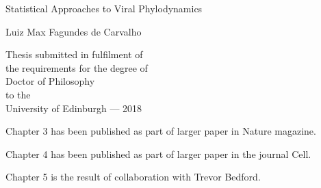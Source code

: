 \thispagestyle{empty}
\begin{minipage}{\textwidth}
\end{minipage}
\begin{center}
\vspace{2cm}
{ \Huge Statistical Approaches to Viral Phylodynamics
  \par
  \vspace{0.5cm} 
{\Large Luiz Max Fagundes de Carvalho \par}
}
\end{center}
\vfill
\begin{center}
\vspace{6cm}    
\centerline{}
\vspace{0.5cm}
Thesis submitted in fulfilment of\\
the requirements for the degree of\\ 
Doctor of Philosophy\\ 
to the\\
University of Edinburgh --- 2018
\end{center}

\newpage
\thispagestyle{empty}

Chapter 3 has been published as part of larger paper in Nature magazine.

Chapter 4 has been published as part of larger paper in the journal Cell.

Chapter 5 is the result of collaboration with Trevor Bedford.

